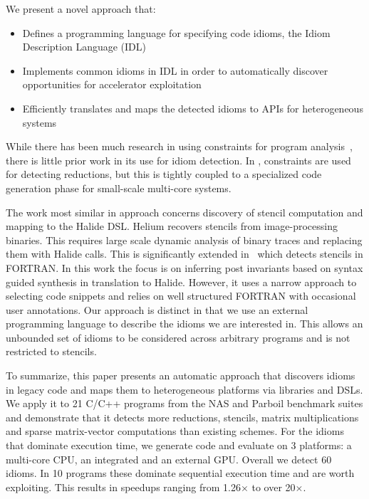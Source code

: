     We present a novel approach that:
    \begin{itemize}
    \item Defines a programming language for specifying code idioms, the Idiom
          Description Language (IDL)
    \item Implements common idioms in IDL in order to automatically discover
          opportunities for accelerator exploitation
    \item Efficiently translates and maps the detected idioms to APIs for
          heterogeneous systems
    \end{itemize}

    While there has been much research in
    using constraints for program analysis~\cite{nielson2015principles},
    there is little prior work in its use for idiom
    detection. In \cite{ginsbach2017discovery}, constraints are used for
    detecting reductions, but this is tightly coupled to a specialized code
    generation phase for small-scale multi-core systems.

    The work most similar in approach concerns discovery of stencil computation
    and mapping to the Halide DSL.
    Helium \cite{Mendis2015Helium} recovers stencils from image-processing
    binaries.
    This requires large scale dynamic analysis of binary traces and replacing
    them with Halide calls. 
    This is significantly extended in~\cite{Kamil2016Verified} which detects
    stencils in FORTRAN.
    In this work the focus is on inferring post invariants based on syntax
    guided synthesis in translation to Halide.
    However, it uses a narrow approach to selecting code snippets and relies on
    well structured FORTRAN with occasional user annotations.
    Our approach is distinct in that we use an external  programming language to
    describe the idioms we are interested in.
    This allows an unbounded set of idioms  to be considered across arbitrary
    programs and is not restricted to stencils. 

    To summarize, this paper presents an automatic approach that discovers
    idioms in legacy code and maps them to heterogeneous platforms via
    libraries and DSLs.
    We apply it to 21 C/C++ programs from the NAS and Parboil benchmark suites
    and demonstrate that it detects more reductions, stencils, matrix
    multiplications and sparse matrix-vector computations than existing schemes.
    For the idioms that dominate execution time, we generate code and evaluate
    on 3 platforms: a multi-core CPU, an integrated and an external GPU. Overall
    we detect 60 idioms.
    In 10 programs these dominate sequential execution time and are worth
    exploiting.
    This results in speedups ranging from 1.26$\times$ to over 20$\times$.

